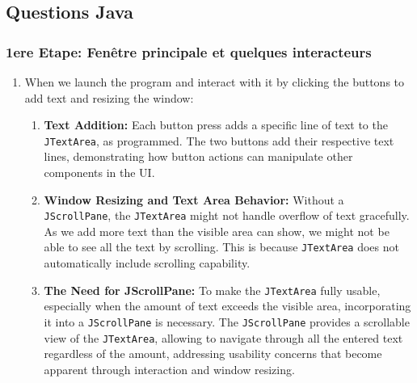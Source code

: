 \documentclass[
]{article}
\begin{document}
\subsection{Questions Java}\label{questions-java}

\subsubsection{1ere Etape: Fenêtre principale et quelques
interacteurs}\label{ere-etape-fenuxeatre-principale-et-quelques-interacteurs}

\begin{enumerate}
\def\labelenumi{\arabic{enumi}.}
\item
  When we launch the program and interact with it by clicking the
  buttons to add text and resizing the window:

  \begin{enumerate}
  \def\labelenumii{\arabic{enumii}.}
  \item
    \textbf{Text Addition:} Each button press adds a specific line of
    text to the \texttt{JTextArea}, as programmed. The two buttons add
    their respective text lines, demonstrating how button actions can
    manipulate other components in the UI.
  \item
    \textbf{Window Resizing and Text Area Behavior:} Without a
    \texttt{JScrollPane}, the \texttt{JTextArea} might not handle
    overflow of text gracefully. As we add more text than the visible
    area can show, we might not be able to see all the text by
    scrolling. This is because \texttt{JTextArea} does not automatically
    include scrolling capability.
  \item
    \textbf{The Need for JScrollPane:} To make the \texttt{JTextArea}
    fully usable, especially when the amount of text exceeds the visible
    area, incorporating it into a \texttt{JScrollPane} is necessary. The
    \texttt{JScrollPane} provides a scrollable view of the
    \texttt{JTextArea}, allowing to navigate through all the entered
    text regardless of the amount, addressing usability concerns that
    become apparent through interaction and window resizing.
  \end{enumerate}
\end{enumerate}
\end{document}
